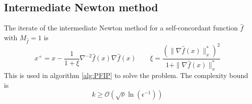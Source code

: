 \documentclass[12pt, openany]{report}
\theoremstyle{definition}
\begin{document}
\subsection{Intermediate Newton method}
The iterate of the intermediate Newton method for a self-concordant function $\hat f$ with $M_{\hat f} = 1$ is 
\begin{equation}
	x^+ = x - \frac{1}{1+\xi} \nabla^{-2}\hat f(x)\nabla \hat f(x) \qquad \xi = \frac{(\|\nabla \hat f(x)\|_x^*)^2}{1+\|\nabla \hat f(x)\|_x^*}
\end{equation}
This is used in algorithm \ref{alg:PFIP} to solve the problem. The complexity bound is 
\begin{equation}
	k\ge \mathcal{O}(\sqrt{\nu}\ln(\epsilon^{-1}))
\end{equation}
\end{document}
